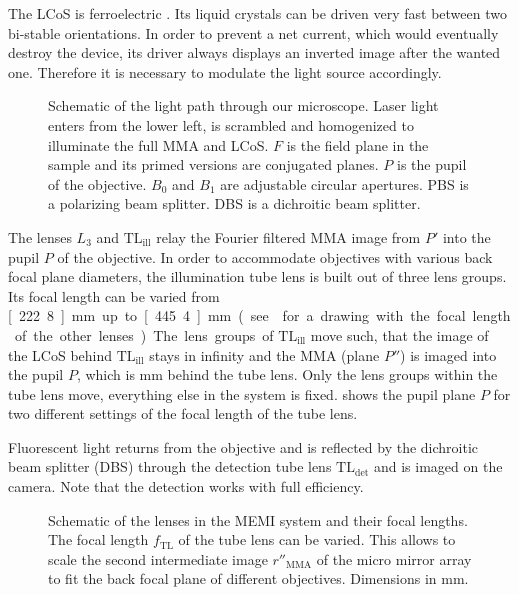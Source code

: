 The LCoS is ferroelectric \citetext{\citealp[see][]{1991Saleh} and
  \citealp[p.~192]{Goodman1996}}.  Its liquid crystals can be driven
very fast between two bi-stable orientations. In order to prevent a
net current, which would eventually destroy the device, its driver
always displays an inverted image after the wanted one. Therefore it
is necessary to modulate the light source accordingly.


\begin{figure}[H]
  \centering
  \def\svgscale{2}
  
  \caption{Schematic of the light path through our microscope. Laser
    light enters from the lower left, is scrambled and homogenized to
    illuminate the full MMA and LCoS. $F$ is the field plane in the
    sample and its primed versions are conjugated planes. $P$ is the
    pupil of the objective. $B_0$ and $B_1$ are adjustable circular
    apertures. PBS is a polarizing beam splitter. DBS is a dichroitic
    beam splitter.}
  \label{fig:memi-real}
\end{figure}


The lenses $L_3$ and $\textrm{TL}_\textrm{ill}$ relay the Fourier
filtered MMA image from $P'$ into the pupil $P$ of the objective. In
order to accommodate objectives with various back focal plane
diameters, the illumination tube lens is built out of three lens
groups. Its focal length can be varied from \unit[222.8]{mm} up to
\unit[445.4]{mm} (see  for a drawing with the
focal length of the other lenses). The lens groups of
$\textrm{TL}_\textrm{ill}$ move such, that the image of the LCoS
behind $\textrm{TL}_\textrm{ill}$ stays in infinity and the MMA
(plane $P''$) is imaged into the pupil $P$, which is \unit[250]{mm}
behind the tube lens. Only the lens groups within the tube lens
move, everything else in the system is
fixed.  shows the pupil plane $P$ for two
different settings of the focal length of the tube lens.

Fluorescent light returns from the objective and is reflected by the
dichroitic beam splitter (DBS) through the detection tube lens
$\textrm{TL}_\textrm{det}$ and is imaged on the camera. Note that the
detection works with full efficiency.

\begin{figure}
   \centering
   \def\svgscale{2}
   
   \caption{Schematic of the lenses in the MEMI system and their focal
     lengths. The focal length $f_\textrm{TL}$ of the tube lens can be
     varied. This allows to scale the second intermediate image
     $r''_\textrm{MMA}$ of the micro mirror array to fit the back
     focal plane of different objectives. Dimensions in mm.}
   \label{fig:memi-sketch}
 \end{figure}
 

